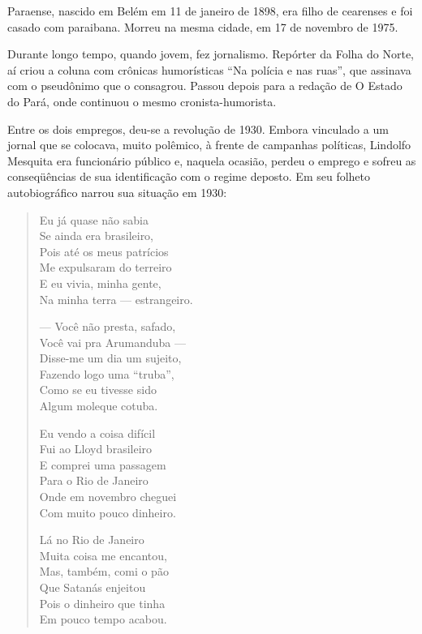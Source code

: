 Paraense, nascido em Belém em 11 de janeiro de 1898, era filho de
cearenses e foi casado com paraibana. Morreu na mesma cidade, em 17
de novembro de 1975.

 Durante longo tempo, quando jovem, fez jornalismo. Repórter da Folha
do Norte, aí criou a coluna com crônicas humorísticas “Na polícia e
nas ruas”, que assinava com o pseudônimo que o consagrou. Passou
depois para a redação de O Estado do Pará, onde continuou o mesmo
cronista-humorista.

Entre os dois empregos, deu-se a revolução de 1930. Embora vinculado a
um jornal que se colocava, muito polêmico, à frente de campanhas
políticas, Lindolfo Mesquita era funcionário público e, naquela
ocasião, perdeu o emprego e sofreu as conseqüências de sua
identificação com o regime deposto. Em seu folheto autobiográfico
narrou sua situação em 1930:


\begin{verse}
Eu já quase não sabia\\
Se ainda era brasileiro,\\
Pois até os meus patrícios\\
Me expulsaram do terreiro\\
E eu vivia, minha gente, \\
Na minha terra — estrangeiro.

— Você não presta, safado, \\
Você vai pra Arumanduba —\\
Disse-me um dia um sujeito,\\
Fazendo logo uma “truba”,\\
Como se eu tivesse sido\\
Algum moleque cotuba.

Eu vendo a coisa difícil\\
Fui ao Lloyd brasileiro\\
E comprei uma passagem\\
Para o Rio de Janeiro\\
Onde em novembro cheguei\\
Com muito pouco dinheiro.

Lá no Rio de Janeiro\\
Muita coisa me encantou,\\
Mas, também, comi o pão\\
Que Satanás enjeitou\\
Pois o dinheiro que tinha\\
Em pouco tempo acabou.
\end{verse}


